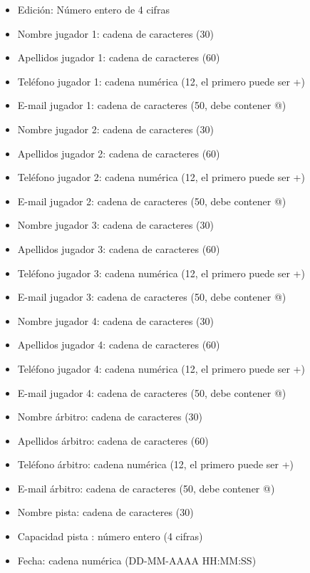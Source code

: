 \begin{itemize}
	\item Edición: Número entero de 4 cifras
\newline
	\item Nombre jugador 1: cadena de caracteres (30)
	\item Apellidos jugador 1: cadena de caracteres (60)
	\item Teléfono jugador 1: cadena numérica (12, el primero puede ser +)
	\item E-mail jugador 1: cadena de caracteres (50, debe contener @)
\newline
	\item Nombre jugador 2: cadena de caracteres (30)
	\item Apellidos jugador 2: cadena de caracteres (60)
	\item Teléfono jugador 2: cadena numérica (12, el primero puede ser +)
	\item E-mail jugador 2: cadena de caracteres (50, debe contener @)
\newline
	\item Nombre jugador 3: cadena de caracteres (30)
	\item Apellidos jugador 3: cadena de caracteres (60)
	\item Teléfono jugador 3: cadena numérica (12, el primero puede ser +)
	\item E-mail jugador 3: cadena de caracteres (50, debe contener @)
\newline
	\item Nombre jugador 4: cadena de caracteres (30)
	\item Apellidos jugador 4: cadena de caracteres (60)
	\item Teléfono jugador 4: cadena numérica (12, el primero puede ser +)
	\item E-mail jugador 4: cadena de caracteres (50, debe contener @)
\newline
	\item Nombre árbitro: cadena de caracteres (30)
	\item Apellidos árbitro: cadena de caracteres (60)
	\item Teléfono árbitro: cadena numérica (12, el primero puede ser +)
	\item E-mail árbitro: cadena de caracteres (50, debe contener @)
\newline
	\item Nombre pista: cadena de caracteres (30)
	\item Capacidad pista : número entero (4 cifras)
	\item Fecha: cadena numérica (DD-MM-AAAA HH:MM:SS)

\end{itemize}

